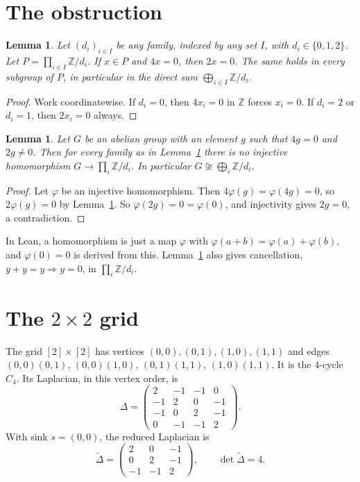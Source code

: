 \documentclass[11pt]{article}
\newtheorem{lemma}[theorem]{Lemma}
\theoremstyle{definition}
\theoremstyle{remark}
\newcommand{\Z}{\mathbb{Z}}
\begin{document}
\section{The obstruction}
\begin{lemma}\label{lem:target}
Let $(d_i)_{i\in I}$ be any family, indexed by any set $I$, with
$d_i\in\{0,1,2\}$. Let $P=\prod_{i\in I}\Z/d_i$. If $x\in P$ and $4x=0$, then
$2x=0$. The same holds in every subgroup of $P$, in particular in the direct
sum $\bigoplus_{i\in I}\Z/d_i$.
\end{lemma}
\begin{proof}
Work coordinatewise. If $d_i=0$, then $4x_i=0$ in $\Z$ forces $x_i=0$. If
$d_i=2$ or $d_i=1$, then $2x_i=0$ always.
\end{proof}

\begin{lemma}\label{lem:transfer}
Let $G$ be an abelian group with an element $g$ such that $4g=0$ and $2g\ne0$.
Then for every family as in Lemma~\ref{lem:target} there is no injective
homomorphism $G\to\prod_i\Z/d_i$. In particular $G\not\cong\bigoplus_i\Z/d_i$.
\end{lemma}
\begin{proof}
Let $\varphi$ be an injective homomorphism. Then $4\varphi(g)=\varphi(4g)=0$, so
$2\varphi(g)=0$ by Lemma~\ref{lem:target}. So $\varphi(2g)=0=\varphi(0)$, and
injectivity gives $2g=0$, a contradiction.
\end{proof}
In Lean, a homomorphism is just a map $\varphi$ with
$\varphi(a+b)=\varphi(a)+\varphi(b)$, and $\varphi(0)=0$ is derived from
this. Lemma~\ref{lem:target} also gives cancellation, $y+y=y\Rightarrow y=0$,
in $\prod_i\Z/d_i$.

\section{\texorpdfstring{The $2\times2$ grid}{The 2x2 grid}}
The grid $[2]\times[2]$ has vertices $(0,0),(0,1),(1,0),(1,1)$ and edges
$(0,0)(0,1)$, $(0,0)(1,0)$, $(0,1)(1,1)$, $(1,0)(1,1)$. It is the $4$-cycle
$C_4$. Its Laplacian, in this vertex order, is
\[
\Delta=\begin{pmatrix}2&-1&-1&0\\-1&2&0&-1\\-1&0&2&-1\\0&-1&-1&2\end{pmatrix}.
\]
With sink $s=(0,0)$, the reduced Laplacian is
\[
\tilde\Delta=\begin{pmatrix}2&0&-1\\0&2&-1\\-1&-1&2\end{pmatrix},\qquad
\det\tilde\Delta=4 .
\]
\end{document}
